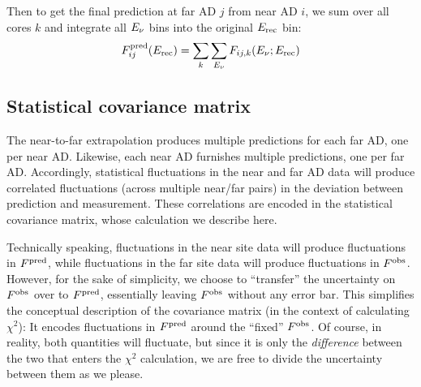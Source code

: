 \documentclass[../thesis.tex]{subfiles}
\begin{document}
Then to get the final prediction at far AD $j$ from near AD $i$, we sum over all cores $k$ and integrate all $E_\mathrm{\nu}$ bins into the original $E_\mathrm{rec}$ bin:
\begin{equation}
  F^{\mathrm{pred}}_{ij}(E_\mathrm{rec}) = \sum_k \sum_{E_\mathrm{\nu}} F_{ij,k}(E_\mathrm{\nu}; E_\mathrm{rec})
\end{equation}

\begin{comment}
Near site spectrum divided into Erec bins.

For each bin, convert to true energy using matrix.

For each true energy bin (from this single Erec bin), determine fraction from each core using baselines and power.

For each core, undo 1/L^2 and oscillation, then apply them for each far site

Sum up cores, repeat for all Etrue bins (still for this single Erec bin)

Integrate back into original Erec bin at far site. Repeat for all bins.

In this way we get 16 predictions.
\end{comment}

\subsection{Statistical covariance matrix}
\label{sec:fitStatCovMat}

The near-to-far extrapolation produces multiple predictions for each far AD, one per near AD. Likewise, each near AD furnishes multiple predictions, one per far AD. Accordingly, statistical fluctuations in the near and far AD data will produce correlated fluctuations (across multiple near/far pairs) in the deviation between prediction and measurement. These correlations are encoded in the statistical covariance matrix, whose calculation we describe here.

Technically speaking, fluctuations in the near site data will produce fluctuations in $F^{\mathrm{pred}}$, while fluctuations in the far site data will produce fluctuations in $F^{\mathrm{obs}}$. However, for the sake of simplicity, we choose to ``transfer'' the uncertainty on $F^{\mathrm{obs}}$ over to $F^{\mathrm{pred}}$, essentially leaving $F^{\mathrm{obs}}$ without any error bar. This simplifies the conceptual description of the covariance matrix (in the context of calculating $\chi^2$): It encodes fluctuations in $F^{\mathrm{pred}}$ around the ``fixed'' $F^{\mathrm{obs}}$. Of course, in reality, both quantities will fluctuate, but since it is only the \emph{difference} between the two that enters the $\chi^2$ calculation, we are free to divide the uncertainty between them as we please.
\end{document}
